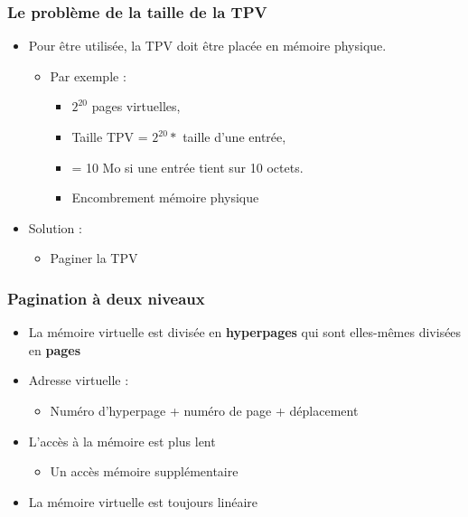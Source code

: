 \begin{frame}
\frametitle{Le problème de la taille de la TPV}
\begin{itemize}
\item Pour être utilisée, la TPV doit être placée en mémoire physique.
\begin{itemize}
\item Par exemple :
\begin{itemize}
\item $2^{20}$ pages virtuelles,
\item Taille TPV = $2^{20} * $ taille d'une entrée,
\item = 10 Mo si une entrée tient sur 10 octets.
\item Encombrement mémoire physique
\end{itemize}
\end{itemize}
\item Solution :
\begin{itemize}
\item Paginer la TPV
\end{itemize}
\end{itemize}
\end{frame}

\begin{frame}
\frametitle{Pagination à deux niveaux}
\begin{itemize}
\item La mémoire virtuelle est divisée en \textbf{hyperpages} qui sont elles-mêmes divisées en \textbf{pages}
\item Adresse virtuelle :
\begin{itemize}
\item Numéro d'hyperpage + numéro de page + déplacement
\end{itemize}
\item L'accès à la mémoire est plus lent
\begin{itemize}
\item Un accès mémoire supplémentaire
\end{itemize}
\item La mémoire virtuelle est toujours linéaire
\end{itemize}
\end{frame}


